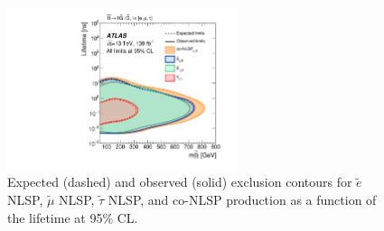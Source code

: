  \begin{figure}[!ht]
    \centering
        \includegraphics[width=0.6\textwidth]{figures/limits/displaced_lepton_summary.pdf}
    \caption{
    Expected (dashed) and observed (solid) exclusion contours for $\tilde{e}$ \ac{NLSP}, $\tilde{\mu}$ \ac{NLSP}, $\tilde{\tau}$ \ac{NLSP}, and co-NLSP production as a function of the lifetime at 95\% CL.
    }
    \label{fig:excl_limit}
\end{figure}

